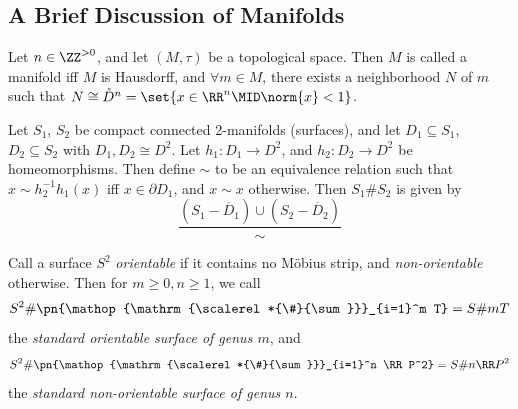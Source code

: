 \documentclass{fkbook}
\DeclareMathOperator*{\csum}{\scalerel*{\#}{\sum}}
\begin{document}
\begin{adjustwidth}{1em}{1em}
  \section{A Brief Discussion of Manifolds}

  \begin{definition}[Manifolds]
    Let $n \in \ZZ^{>0}$, and let $(M, \tau)$ be a topological space.
    Then $M$ is called a manifold iff $M$ is Hausdorff, and $\forall m
    \in M$, there exists a neighborhood $N$ of $m$ such that $N \cong
    \mathring{D}^n = \set{x \in \RR^n \MID \norm{x} < 1}$.
  \end{definition}
  \begin{definition}
    Let $S_1$, $S_2$ be compact connected 2-manifolds (surfaces), and
    let $D_1 \subseteq S_1$, $D_2 \subseteq S_2$ with $D_1, D_2 \cong
    D^2$. Let $h_1 : D_1 \to D^2$, and $h_2 : D_2 \to D^2$ be
    homeomorphisms. Then define $\sim$ to be an equivalence relation
    such that $x \sim h^{-1}_2 h_1(x)$ iff $x \in \partial D_1$, and
    $x \sim x$ otherwise. Then $S_1 \# S_2$ is given by
    \[
      \frac{(S_1 - \mathring{D_1}) \cup (S_2 - \mathring{D_2})}{\sim}
    \]
  \end{definition}
  \begin{definition}
    Call a surface $S^2$ \emph{orientable} if it contains no
    M\"{o}bius strip, and \emph{non-orientable} otherwise. Then for $m
    \geq 0, n \geq 1$, we call
    \[
      S^2 \# \pn{\csum_{i=1}^m T} = S \# mT
    \]
    the \emph{standard orientable surface of genus $m$}, and
    \[
      S^2 \# \pn{\csum_{i=1}^n \RR P^2} = S \# n\RR P^2
    \]
    the \emph{standard non-orientable surface of genus $n$}.
  \end{definition}

\end{adjustwidth}
\end{document}
